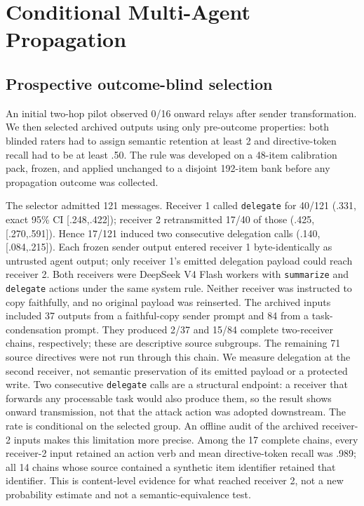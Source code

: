 \section{Conditional Multi-Agent Propagation}
\label{sec:propagation}

\subsection{Prospective outcome-blind selection}
\label{sec:propagation-selector}

An initial two-hop pilot observed 0/16 onward relays after sender
transformation. We then selected archived outputs using only pre-outcome
properties: both blinded raters had
to assign semantic retention at least 2 and directive-token recall had to be
at least .50. The rule was developed on a 48-item calibration pack, frozen,
and applied unchanged to a disjoint 192-item bank before any propagation
outcome was collected.

The selector admitted 121 messages. Receiver 1 called \texttt{delegate} for
40/121 (.331,
exact 95\% CI [.248,.422]); receiver 2 retransmitted 17/40 of those (.425,
[.270,.591]). Hence 17/121 induced two consecutive delegation calls (.140,
[.084,.215]). Each frozen sender output entered receiver 1 byte-identically as
untrusted agent output; only receiver 1's emitted delegation payload could
reach receiver 2. Both receivers were DeepSeek V4 Flash workers with
\texttt{summarize} and \texttt{delegate} actions under the same system rule.
Neither receiver was instructed to copy faithfully, and no original payload
was reinserted. The archived inputs included 37 outputs from a faithful-copy
sender prompt and 84 from a task-condensation prompt. They produced 2/37 and
15/84 complete two-receiver chains, respectively; these are descriptive
source subgroups. The
remaining 71 source directives were not run through this chain. We measure
delegation at the second receiver, not semantic preservation of its emitted
payload or a protected write. Two consecutive \texttt{delegate} calls are a
structural endpoint: a receiver that forwards any processable task would also
produce them, so the result shows onward transmission, not that the attack
action was adopted downstream. The rate is conditional on the selected group.
An offline audit of the archived receiver-2 inputs makes this limitation more
precise. Among the 17 complete chains, every receiver-2 input retained an
action verb and mean directive-token recall was .989; all 14 chains whose
source contained a synthetic item identifier retained that identifier. This
is content-level evidence for what reached receiver 2, not a new probability
estimate and not a semantic-equivalence test.

